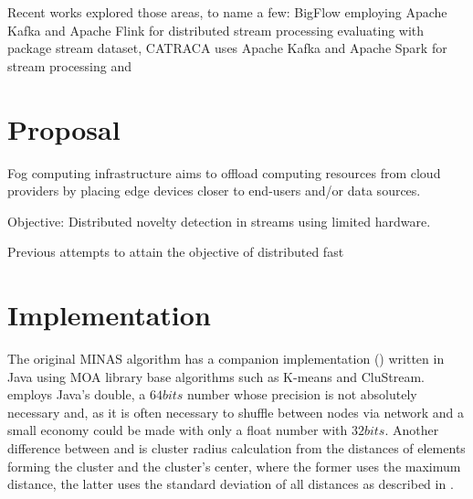 \documentclass[conference]{IEEEtran}
\begin{document}
Recent works explored those areas, to name a few: BigFlow \cite{Viegas2019}
employing Apache Kafka and Apache Flink for distributed stream processing
evaluating with package stream dataset,
CATRACA \cite{Lopez2018,AndreoniLopez2019a} uses 
Apache Kafka and Apache Spark for stream processing and 


\section{Proposal}\label{sec:prop}


Fog computing infrastructure aims to offload
computing resources from cloud providers by placing edge
devices closer to end-users and/or data sources.

Objective: Distributed novelty detection in streams using limited hardware.

Previous attempts to attain the objective of distributed fast 



\section{Implementation}\label{sec:implementation}

The original MINAS algorithm has a companion implementation ()
written in Java using MOA library base algorithms such as K-means and CluStream.
 employs Java's double, a $64 bits$ number whose precision is not
absolutely necessary and, as it is often necessary to shuffle between nodes via
network and a small economy could be made with only a float number with $32 bits$.
Another difference between  and \mfog is cluster radius calculation
from the distances of elements forming the cluster and the cluster's center,
where the former uses the maximum distance, the latter uses the standard deviation
of all distances as described in \cite{Faria2016minas}.
\end{document}
